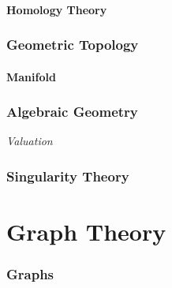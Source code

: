 \documentclass{article}
\begin{document}
\subsection{Homology Theory}\label{subsec:homology_theory}

\section{Geometric Topology}\label{sec:geometric_topology}
\subsection{Manifold}\label{subsec:manifold}

\section{Algebraic Geometry}\label{sec:algebraic_geometry}

\emph{Valuation}

\section{Singularity Theory}\label{sec:singularity_theory}
\part{Graph Theory}

\section{Graphs} \label{sec:graphs}
\end{document}

